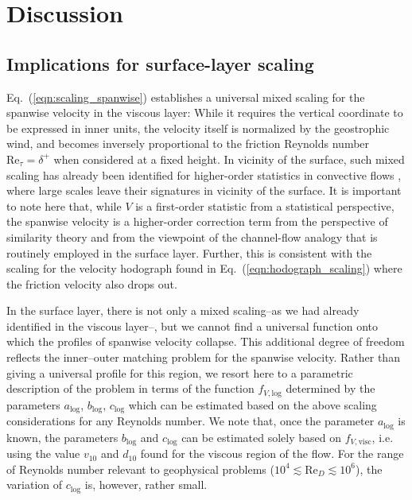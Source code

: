 \documentclass[smallcondensed,final]{svjour3}
\newcommand{\RE}{\mathrm{Re}}
\begin{document}
\section{Discussion}
\subsection{Implications for surface-layer scaling} 
Eq.~(\ref{eqn:scaling_spanwise}) establishes a universal mixed scaling for the spanwise velocity in the viscous layer:
%
While it requires the vertical coordinate to be expressed in inner units, the velocity itself is normalized by the geostrophic wind, and becomes inversely proportional to the friction Reynolds number $\RE_\tau=\delta^+$ when considered at a fixed height.
%
In vicinity of the surface, such mixed scaling has already been identified for higher-order statistics in convective flows \citep{mellado:BM2016,li:JAS2018}, where large scales leave their signatures in vicinity of the surface.
%
It is important to note here that, while $V$ is a first-order statistic from a statistical perspective, the spanwise velocity is a higher-order correction term from the perspective of similarity theory and from the viewpoint of the channel-flow analogy that is routinely employed in the surface layer.
%
Further, this is consistent with the scaling for the velocity hodograph found in Eq.~(\ref{eqn:hodograph_scaling}) where the friction velocity also drops out.
%
\par
%
In the surface layer, there is not only a mixed scaling--as we had already identified in the viscous layer--, but we cannot find a universal function onto which the profiles of spanwise velocity collapse. 
%
This additional degree of freedom reflects the inner--outer matching problem for the spanwise velocity. 
%
Rather than giving a universal profile for this region, we resort here to a parametric description of the problem in terms of the function $f_{V,\mathrm{log}}$ determined by the parameters $a_\mathrm{log}$, $b_\mathrm{log}$, $c_\mathrm{log}$ which can be estimated based on the above scaling considerations for any Reynolds number.
%
We note that, once the parameter $a_\mathrm{log}$ is known, the parameters $b_\mathrm{log}$ and $c_\mathrm{log}$ can be estimated solely based on $f_{V,\mathrm{visc}}$, i.e. using the value $v_{10}$ and $d_{10}$ found for the viscous region of the flow.
%
For the range of Reynolds number relevant to geophysical problems ($10^4\lesssim \RE_D \lesssim 10^6$), the variation of $c_\mathrm{log}$ is, however, rather small.
\end{document}
